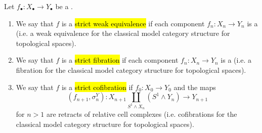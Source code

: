 \begin{definition} \label{definition:model_category_classes_for_spectra_of_topological_spaces}
Let $f_\bullet: X_\bullet \to Y_\bullet$ be a . 
\begin{enumerate}
    \item We say that $f$ is a \hl{strict weak equivalence} if each component $f_n: X_n \to Y_n$ is a  (i.e. a weak equivalence for the classical model category structure for topological spaces).

    \item We say that $f$ is a \hl{strict fibration} if each component $f_n: X_n \to Y_n$ is a  (i.e. a fibration for the classical model category structure for topological spaces).

    \item We say that $f$ is a \hl{strict cofibration} if $f_0: X_0 \to Y_0$ and the maps 
    $$(f_{n+1}, \sigma_n^Y): X_{n+1} \coprod_{S^1 \wedge X_n} (S^1 \wedge Y_n) \to Y_{n+1}$$
    for $n > 1$ are retracts of relative cell complexes (i.e. cofibrations for the classical model category structure for topological spaces).

\end{enumerate}
\end{definition}